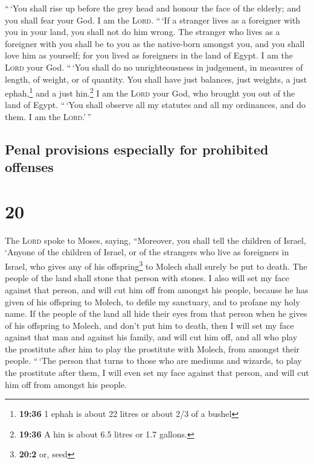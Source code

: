  ``\,`You shall rise up before the grey head and honour
the face of the elderly; and you shall fear your God. I am the
\textsc{Lord}.  ``\,`If a stranger lives as a foreigner
with you in your land, you shall not do him wrong.  The
stranger who lives as a foreigner with you shall be to you as the
native-born amongst you, and you shall love him as yourself; for you
lived as foreigners in the land of Egypt. I am the \textsc{Lord} your
God.  ``\,`You shall do no unrighteousness in judgement,
in measures of length, of weight, or of quantity.  You
shall have just balances, just weights, a just ephah,\footnote{\textbf{19:36}
  1 ephah is about 22 litres or about 2/3 of a bushel} and a just
hin.\footnote{\textbf{19:36} A hin is about 6.5 litres or 1.7 gallons.}
I am the \textsc{Lord} your God, who brought you out of the land of
Egypt.  ``\,`You shall observe all my statutes and all my
ordinances, and do them. I am the \textsc{Lord}.'\,''

\hypertarget{penal-provisions-especially-for-prohibited-offenses}{%
\subsection{Penal provisions especially for prohibited
offenses}\label{penal-provisions-especially-for-prohibited-offenses}}

\hypertarget{section-19}{%
\section{20}\label{section-19}}

 The \textsc{Lord} spoke to Moses, saying, 
``Moreover, you shall tell the children of Israel, `Anyone of the
children of Israel, or of the strangers who live as foreigners in
Israel, who gives any of his offspring\footnote{\textbf{20:2} or, seed}
to Molech shall surely be put to death. The people of the land shall
stone that person with stones.  I also will set my face
against that person, and will cut him off from amongst his people,
because he has given of his offspring to Molech, to defile my sanctuary,
and to profane my holy name.  If the people of the land
all hide their eyes from that person when he gives of his offspring to
Molech, and don't put him to death,  then I will set my
face against that man and against his family, and will cut him off, and
all who play the prostitute after him to play the prostitute with
Molech, from amongst their people.  ``\,`The person that
turns to those who are mediums and wizards, to play the prostitute after
them, I will even set my face against that person, and will cut him off
from amongst his people.

